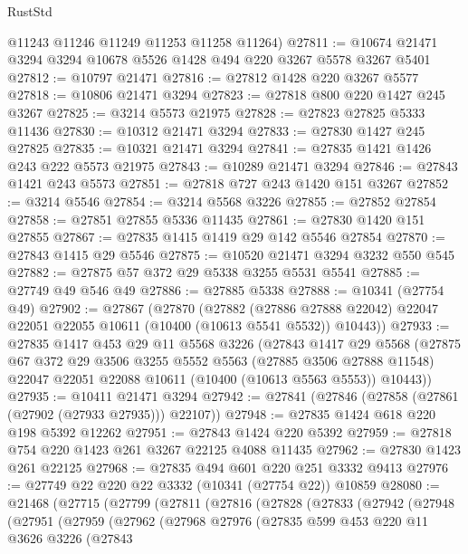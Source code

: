 \begin{lexlean}{RustStd}
\begin{coremodule}
{\begin{coremodule}
{{{{{{{{{{{{{{{{{{{{{{{{{      @11243
      @11246
      @11249
      @11253
      @11258
      @11264)
@27811 := @10674 @21471 @3294 @3294 @10678 @5526 @1428 @494 @220 @3267 @5578 @3267 @5401
@27812 := @10797 @21471
@27816 := @27812 @1428 @220 @3267 @5577
@27818 := @10806 @21471 @3294
@27823 := @27818 @800 @220 @1427 @245 @3267
@27825 := @3214 @5573 @21975
@27828 := @27823 @27825 @5333 @11436
@27830 := @10312 @21471 @3294
@27833 := @27830 @1427 @245 @27825
@27835 := @10321 @21471 @3294
@27841 := @27835 @1421 @1426 @243 @222 @5573 @21975
@27843 := @10289 @21471 @3294
@27846 := @27843 @1421 @243 @5573
@27851 := @27818 @727 @243 @1420 @151 @3267
@27852 := @3214 @5546
@27854 := @3214 @5568 @3226
@27855 := @27852 @27854
@27858 := @27851 @27855 @5336 @11435
@27861 := @27830 @1420 @151 @27855
@27867 := @27835 @1415 @1419 @29 @142 @5546 @27854
@27870 := @27843 @1415 @29 @5546
@27875 := @10520 @21471 @3294 @3232 @550 @545
@27882 := @27875 @57 @372 @29 @5338 @3255 @5531 @5541
@27885 := @27749 @49 @546 @49
@27886 := @27885 @5338
@27888 := @10341 (@27754 @49)
@27902 := @27867
    (@27870
      (@27882
        (@27886 @27888 @22042)
        @22047
        @22051
        @22055
        @10611
        (@10400 (@10613 @5541 @5532))
        @10443))
@27933 := @27835
    @1417
    @453
    @29
    @11
    @5568
    @3226
    (@27843
      @1417
      @29
      @5568
      (@27875
        @67
        @372
        @29
        @3506
        @3255
        @5552
        @5563
        (@27885 @3506 @27888 @11548)
        @22047
        @22051
        @22088
        @10611
        (@10400 (@10613 @5563 @5553))
        @10443))
@27935 := @10411 @21471 @3294
@27942 := @27841 (@27846 (@27858 (@27861 (@27902 (@27933 @27935))) @22107))
@27948 := @27835 @1424 @618 @220 @198 @5392 @12262
@27951 := @27843 @1424 @220 @5392
@27959 := @27818 @754 @220 @1423 @261 @3267 @22125 @4088 @11435
@27962 := @27830 @1423 @261 @22125
@27968 := @27835 @494 @601 @220 @251 @3332 @9413
@27976 := @27749 @22 @220 @22 @3332 (@10341 (@27754 @22)) @10859
@28080 := @21468
    (@27715
      (@27799
        (@27811
          (@27816
            (@27828
              (@27833
                (@27942
                  (@27948
                    (@27951
                      (@27959
                        (@27962
                          (@27968
                            @27976
                            (@27835
                              @599
                              @453
                              @220
                              @11
                              @3626
                              @3226
                              (@27843
}}}}}}}}}}}}}}}}}}}}}}}}}
\end{coremodule}}
\end{coremodule}
\end{lexlean}
